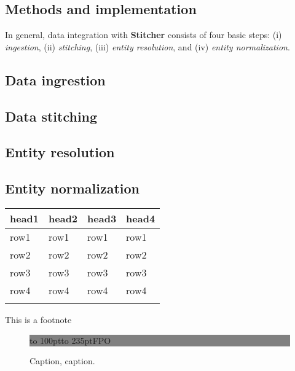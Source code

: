 \documentclass{bioinfo}
\begin{document}
\begin{methods}
\section{Methods and implementation}
In general, data integration with \textbf{Stitcher} consists of four basic steps: (i) \emph{ingestion}, (ii) \emph{stitching}, (iii) \emph{entity resolution}, and (iv) \emph{entity normalization}. 

\subsection{Data ingrestion}

\subsection{Data stitching}

\subsection{Entity resolution}

\subsection{Entity normalization}



\begin{table}[!t]
 {\begin{tabular}{@{}llll@{}}\toprule head1 &
head2 & head3 & head4\\\midrule
row1 & row1 & row1 & row1\\
row2 & row2 & row2 & row2\\
row3 & row3 & row3 & row3\\
row4 & row4 & row4 & row4\\\botrule
\end{tabular}}{This is a footnote}
\end{table}

\end{methods}

\begin{figure}[!tpb]%
\fboxsep=0pt\colorbox{gray}{\begin{minipage}[t]{235pt} \vbox to 100pt{\vfill\hbox to
235pt{\hfill\fontsize{24pt}{24pt}\selectfont FPO\hfill}\vfill}
\end{minipage}}
\caption{Caption, caption.}\label{fig:01}
\end{figure}
\end{document}
